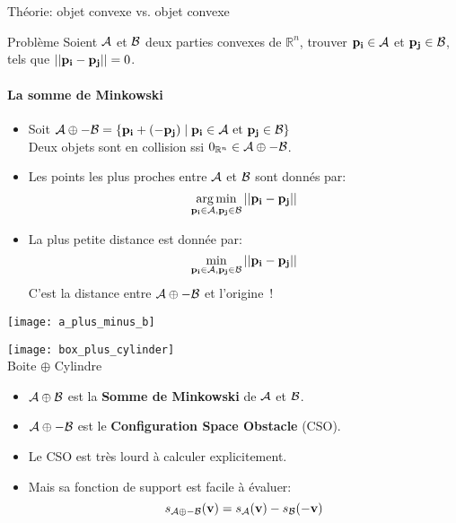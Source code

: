 \begin{frame}{Théorie: objet convexe vs. objet convexe}
     {
    \begin{block}{Problème}
        Soient $\mathcal{A}$ et $\mathcal{B}$ deux parties convexes de
        $\mathbb{R}^n$, trouver ${\bf p_i} \in \mathcal{A}$ et ${\bf p_j} \in
        \mathcal{B}$, tels que $|| {\bf p_i} - {\bf p_j} || = 0$.
    \end{block}
    }
     {
        \framesubtitle{La somme de Minkowski}
     {
    \begin{itemize}
        \item<2-4> Soit $\mathcal{A} \oplus -\mathcal{B} = \{ {\bf p_i} + (-{\bf p_j}) \mid {\bf p_i} \in
            \mathcal{A} \text{ et } {\bf p_j} \in \mathcal{B} \}$\\
            Deux objets sont en collision ssi $0_{\mathbb{R}^n} \in
            \mathcal{A} \oplus -\mathcal{B}$.
        \item<3-4> Les points les plus proches entre $\mathcal{A}$ et
            $\mathcal{B}$ sont donnés par: \[ \operatorname*{arg\,min}\limits_{{\bf p_i} \in
            \mathcal{A}, {\bf p_j} \in \mathcal{B}} || {\bf p_i} - {\bf p_j} || \]
        \item<4> La plus petite distance est donnée par:
            \[ \min\limits_{{\bf p_i} \in \mathcal{A},
            {\bf p_j} \in \mathcal{B}} || {\bf p_i} - {\bf p_j} || \]
            C’est la distance entre $\mathcal{A} \oplus -\mathcal{B}$ et l’origine~!
    \end{itemize}
    }
     {
        \begin{center}
            \texttt{[image: a\_plus\_minus\_b]}
        \end{center}
    }
     {
        \begin{center}
            \texttt{[image: box\_plus\_cylinder]}\\
            Boite $\oplus$ Cylindre
        \end{center}
    }
     {
    \begin{itemize}
        \item<7-> $\mathcal{A} \oplus \mathcal{B}$ est la \textbf{Somme de Minkowski} de $\mathcal{A}$ et $\mathcal{B}$.
        \item<8-> $\mathcal{A} \oplus - \mathcal{B}$ est le \textbf{Configuration Space Obstacle} (CSO).
        \item<9-> Le CSO est très lourd à calculer explicitement.
        \item<10-> Mais sa fonction de support est facile à évaluer:
            \[
                s_{\mathcal{A} \oplus - \mathcal{B}}({\bf v}) = s_{\mathcal{A}}({\bf v}) - s_{\mathcal{B}}(-{\bf v})
            \]
    \end{itemize}
    }
    }
\end{frame}

